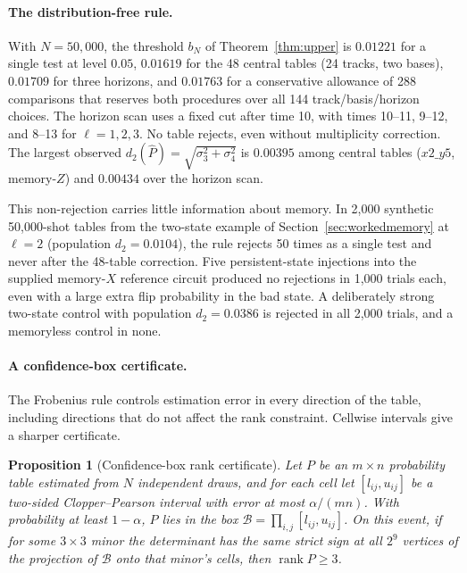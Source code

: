 \documentclass[11pt]{article}
\newtheorem{proposition}[theorem]{Proposition}
\newcommand{\rank}{\operatorname{rank}}
\begin{document}
\paragraph{The distribution-free rule.} With $N=50{,}000$, the threshold $b_N$ of Theorem~\ref{thm:upper} is $0.01221$ for a single test at level $0.05$, $0.01619$ for the 48 central tables (24 tracks, two bases), $0.01709$ for three horizons, and $0.01763$ for a conservative allowance of 288 comparisons that reserves both procedures over all 144 track/basis/horizon choices. The horizon scan uses a fixed cut after time 10, with times 10--11, 9--12, and 8--13 for $\ell=1,2,3$. No table rejects, even without multiplicity correction. The largest observed $d_2(\widehat P)=\sqrt{\sigma_3^2+\sigma_4^2}$ is $0.00395$ among central tables ($x2\_y5$, memory-$Z$) and $0.00434$ over the horizon scan.

This non-rejection carries little information about memory. In 2,000 synthetic 50,000-shot tables from the two-state example of Section~\ref{sec:workedmemory} at $\ell=2$ (population $d_2=0.0104$), the rule rejects 50 times as a single test and never after the 48-table correction. Five persistent-state injections into the supplied memory-$X$ reference circuit produced no rejections in 1,000 trials each, even with a large extra flip probability in the bad state. A deliberately strong two-state control with population $d_2=0.0386$ is rejected in all 2,000 trials, and a memoryless control in none.

\paragraph{A confidence-box certificate.} The Frobenius rule controls estimation error in every direction of the table, including directions that do not affect the rank constraint. Cellwise intervals give a sharper certificate.

\begin{proposition}[Confidence-box rank certificate]
\label{prop:box}
Let $P$ be an $m\times n$ probability table estimated from $N$ independent draws, and for each cell let $[l_{ij},u_{ij}]$ be a two-sided Clopper--Pearson interval \cite{clopper1934use} with error at most $\alpha/(mn)$. With probability at least $1-\alpha$, $P$ lies in the box $\mathcal B=\prod_{i,j}[l_{ij},u_{ij}]$. On this event, if for some $3\times3$ minor the determinant has the same strict sign at all $2^9$ vertices of the projection of $\mathcal B$ onto that minor's cells, then $\rank P\ge3$.
\end{proposition}
\end{document}
